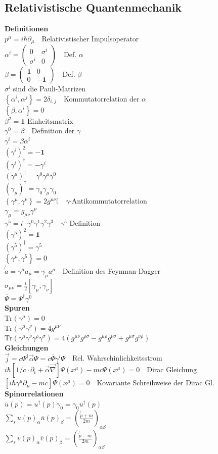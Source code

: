 \documentclass[8pt,a4paper]{extarticle}
\newcommand{\frml}[2]{$#1$~\hfill~#2\\}
\begin{document}
\begin{multicols}{3}
\subsection{Relativistische Quantenmechanik}
\textbf{Definitionen}\\
\frml{p^\mu = i\hbar \partial_\mu}{Relativistischer Impulsoperator}
\frml{\alpha^i = \begin{pmatrix} 0 & \sigma^i \\ \sigma^i & 0 \end{pmatrix}}{Def. $\alpha$}
\frml{\beta = \begin{pmatrix} \mathbf{1} & 0 \\ 0 & -\mathbf{1} \end{pmatrix}}{Def. $\beta$}
$\sigma^i$ sind die Pauli-Matrizen \\
\frml{\left\{\alpha^i,\alpha^j\right\} = 2\delta_{i,j}}{Kommutatorrelation der $\alpha$}
\frml{\left\{\beta, \alpha^i\right\} = 0}{}
\frml{\beta^2 = \mathbf{1} \text{  Einheitsmatrix}}{}
\frml{\gamma^0 = \beta}{Definition der $\gamma$}
\frml{\gamma^i = \beta\alpha^i}{}
\frml{(\gamma^i)^2 = -\mathbf{1}}{}
\frml{(\gamma^i)^\dagger = -\gamma^i}{}
\frml{(\gamma^\mu)^\dagger = \gamma^0\gamma^\mu\gamma^0}{}
\frml{(\gamma_\mu)^\dagger = \gamma_0\gamma_\mu\gamma_0}{}
\frml{\left\{\gamma^\mu,\gamma^\nu \right\} = 2g^{\mu\nu}\mathbb{I}}{$\gamma$-Antikommutatorrelation}
\frml{\gamma_\mu = g_{\mu\nu}\gamma^\nu}{}
\frml{\gamma^5 = i\cdot \gamma^0\gamma^1\gamma^2\gamma^3}{$\gamma^5$ Definition}
\frml{(\gamma^5)^2 = \mathbf{1}}{}
\frml{(\gamma^5)^\dagger = \gamma^5}{}
\frml{\left\{\gamma^\mu, \gamma^5\right\} = 0}{}
\frml{\not{a} = \gamma^\mu a_\mu = \gamma_\mu a^\mu}{Definition des Feynman-Dagger}
\frml{\sigma_{\mu\nu} = \frac{i}{2}\left[\gamma_\mu, \gamma_\nu\right]}{}
\frml{\overline{\Psi} = \Psi^\dagger \gamma^0}{}
\textbf{Spuren}\\
\frml{\mathrm{Tr}\left( \gamma^\mu\right) = 0}{}
\frml{\mathrm{Tr}\left( \gamma^\mu\gamma^\nu\right) = 4g^{\mu\nu}}{}
\frml{\mathrm{Tr}\left(\gamma^\mu\gamma^\nu\gamma^\rho\gamma^\sigma\right) = 4\left(g^{\mu\nu}g^{\rho\sigma}-g^{\mu\rho}g^{\nu\sigma}+g^{\mu\sigma}g^{\nu\rho}\right)}{}
\textbf{Gleichungen}\\
\frml{\vec{j} = c \Psi^\dagger \vec{\alpha} \Psi = c \overline{\Psi} \gamma^i \Psi}{Rel. Wahrschinlichkeitsstrom}
\frml{i\hbar\left[ 1/c \cdot \partial_t + \vec{\alpha}\vec{\nabla}\right] \Psi(x^\mu) - mc\Psi(x^\mu) = 0}{Dirac Gleichung}
\frml{\left[i\hbar \gamma^\mu \partial_\mu -mc\right]\Psi(x^\mu)=0}{Kovariante Schreibweise der Dirac Gl.}
\textbf{Spinorrelationen}\\
\frml{\overline{u}(p) = u^\dagger(p)\gamma_0 = \gamma_0u^\dagger(p)}{}
\frml{\sum_s u(p)_\alpha \overline{u}(p)_\beta = \left(\frac{\not{p}+m}{2m}\right)_{\alpha\beta}}{}
\frml{\sum_s v(p)_\alpha \overline{v}(p)_\beta = \left(\frac{\not{p}-m}{2m}\right)_{\alpha\beta}}{}

\end{multicols}
\end{document}
